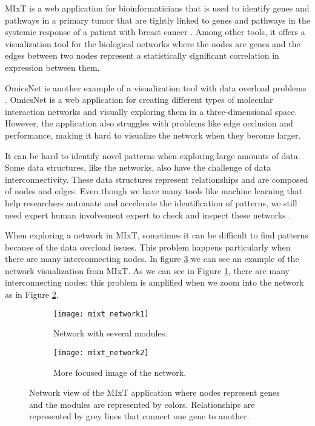 MIxT \cite{fjukstad_dumeaux_olsen_lund_hallett_bongo_2017} is a web application for bioinformaticians that is used to identify genes and pathways in a primary tumor that are tightly linked to genes and pathways in the systemic response of a patient with breast cancer \cite{dumeaux_fjukstad_interactions_tumor_blood}. Among other tools, it offers a visualization tool for the biological networks where the nodes are genes and the edges between two nodes represent a statistically significant correlation in expression between them.

OmicsNet is another example of a visualization tool with data overload problems \cite{omnicsnet}. OmicsNet is a web application for creating different types of molecular interaction networks and visually exploring them in a three-dimensional space. However, the application also struggles with problems like edge occlusion and performance, making it hard to visualize the network when they become larger.

It can be hard to identify novel patterns when exploring large amounts of data. Some data structures, like the networks, also have the challenge of data interconnectivity. These data structures represent relationships and are composed of nodes and edges. Even though we have many tools like machine learning that help researchers automate and accelerate the identification of patterns, we still need expert human involvement expert to check and inspect these networks \cite{network_expert}.

When exploring a network in MIxT, sometimes it can be difficult to find patterns because of the data overload issues. This problem happens particularly when there are many interconnecting nodes. In figure \ref{fig:mixt_network} we can see an example of the network visualization from MIxT. As we can see in Figure \ref{fig:mixt_network1}, there are many interconnecting nodes; this problem is amplified when we zoom into the network as in Figure \ref{fig:mixt_network_zoom}.

\begin{figure}[h!]
    \centering%
    \begin{subfigure}[t]{0.5\textwidth}
        \centering%
        \texttt{[image: mixt\_network1]}
        \caption{Network with several modules.}
        \label{fig:mixt_network1}
    \end{subfigure}%
    \begin{subfigure}[t]{0.5\textwidth}
        \centering%
        \texttt{[image: mixt\_network2]}
        \caption{More focused image of the network.}
        \label{fig:mixt_network_zoom}
    \end{subfigure}

    \caption{Network view of the MIxT application where nodes represent genes and the modules are represented by colors. Relationships are represented by grey lines that connect one gene to another.}
    \label{fig:mixt_network}
\end{figure}


